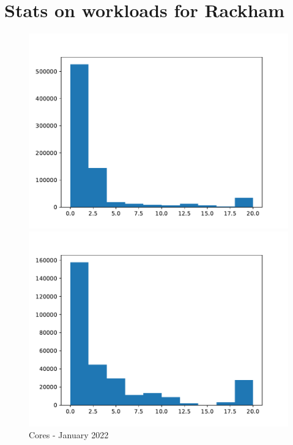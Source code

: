 \documentclass[a4paper]{article}
\begin{document}
\section{Stats on workloads for Rackham}
\begin{figure}[H] 
  \begin{minipage}[b]{0.5\linewidth}
    \centering
    \includegraphics[width=1.11\linewidth]{MBSS/plot/Distribution/2022_01_cores.pdf} 
    \caption{Cores - January 2022} 
    \vspace{4ex}
  \end{minipage}%
  \begin{minipage}[b]{0.5\linewidth}
    \centering
    \includegraphics[width=1.11\linewidth]{MBSS/plot/Distribution/2022_02_cores.pdf} 

\end{minipage}
\end{figure}
\end{document}
